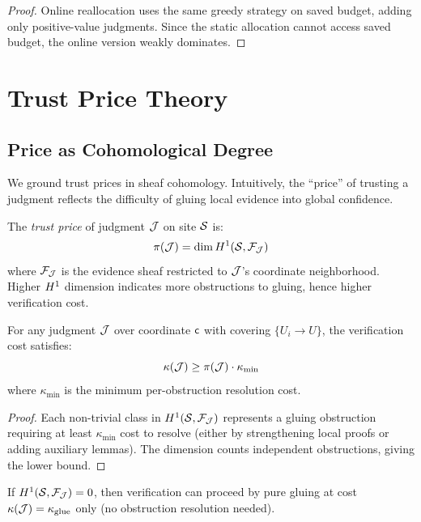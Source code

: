 \documentclass[11pt]{article}
\newcommand{\TrustPrice}{\pi}
\newcommand{\VerifCost}{\kappa}
\begin{document}
\begin{proof}
Online reallocation uses the same greedy strategy on saved budget,
adding only positive-value judgments.  Since the static allocation
cannot access saved budget, the online version weakly dominates.
\end{proof}

\section{Trust Price Theory}\label{sec:price-theory}

\subsection{Price as Cohomological Degree}
We ground trust prices in sheaf cohomology.  Intuitively, the
``price'' of trusting a judgment reflects the difficulty of gluing
local evidence into global confidence.

\begin{definition}\label{def:trust-price}
The \emph{trust price} of judgment $\mathcal{J}$ on site $\mathcal{S}$ is:
\[
  \TrustPrice(\J) = \dim \Hcoh{1}(\Site, \mathcal{F}_{\J})
\]
where $\mathcal{F}_{\mathcal{J}}$ is the evidence sheaf restricted to $\mathcal{J}$'s
coordinate neighborhood.  Higher $H^{1}$ dimension indicates more
obstructions to gluing, hence higher verification cost.
\end{definition}

\begin{theorem}\label{thm:price-cost}
For any judgment $\mathcal{J}$ over coordinate $\mathsf{c}$ with covering
$\{U_i \to U\}$, the verification cost satisfies:
\[
  \VerifCost(\J) \geq \TrustPrice(\J) \cdot \kappa_{\min}
\]
where $\kappa_{\min}$ is the minimum per-obstruction resolution cost.
\end{theorem}

\begin{proof}
Each non-trivial class in $H^{1}(\mathcal{S}, \mathcal{F}_{\mathcal{J}})$
represents a gluing obstruction requiring at least $\kappa_{\min}$
cost to resolve (either by strengthening local proofs or adding
auxiliary lemmas).  The dimension counts independent obstructions,
giving the lower bound.
\end{proof}

\begin{corollary}\label{cor:free-verif}
If $H^{1}(\mathcal{S}, \mathcal{F}_{\mathcal{J}}) = 0$, then verification can
proceed by pure gluing at cost $\VerifCost(\J) = \kappa_{\text{glue}}$
only (no obstruction resolution needed).
\end{corollary}
\end{document}
